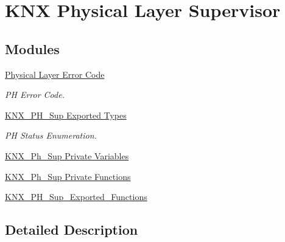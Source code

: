 \hypertarget{group___k_n_x___p_h___sup}{}\section{K\+NX Physical Layer Supervisor}
\label{group___k_n_x___p_h___sup}
\subsection*{Modules}
\begin{DoxyCompactItemize}
\item 
\hyperlink{group___p_h___error___code}{Physical Layer Error Code}
\begin{DoxyCompactList}\small\item\em PH Error Code. \end{DoxyCompactList}\item 
\hyperlink{group___k_n_x___p_h___sup___exported___types}{K\+N\+X\+\_\+\+P\+H\+\_\+\+Sup Exported Types}
\begin{DoxyCompactList}\small\item\em PH Status Enumeration. \end{DoxyCompactList}\item 
\hyperlink{group___k_n_x___p_h___sup___private___variables}{K\+N\+X\+\_\+\+Ph\+\_\+\+Sup Private Variables}
\item 
\hyperlink{group___k_n_x___p_h___sup___private___functions}{K\+N\+X\+\_\+\+Ph\+\_\+\+Sup Private Functions}
\item 
\hyperlink{group___k_n_x___p_h___sup___exported___functions}{K\+N\+X\+\_\+\+P\+H\+\_\+\+Sup\+\_\+\+Exported\+\_\+\+Functions}
\end{DoxyCompactItemize}


\subsection{Detailed Description}
